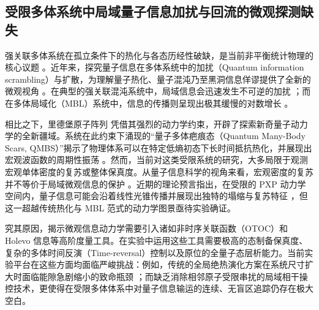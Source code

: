 \documentclass[../main.tex]{subfiles}
\begin{document}
\subsection{受限多体系统中局域量子信息加扰与回流的微观探测缺失}
\label{ch1:subsec:problem_info}
强关联多体系统在孤立条件下的热化与各态历经性破缺，是当前非平衡统计物理的核心议题 \cite{deutsch1991quantum,srednicki1994chaos,rigol2008thermalization,lewis2019dynamics}。近年来，探究量子信息在多体系统中的加扰（Quantum information scrambling）与扩散，为理解量子热化、量子混沌乃至黑洞信息佯谬提供了全新的微观视角 \cite{swingle2018unscrambling,sekino2008fast,hosur2016chaos,maldacena2016bound,hayden2007black,shenker2014black}。在典型的强关联混沌系统中，局域信息会迅速发生不可逆的加扰 \cite{lewis2019dynamics}；而在多体局域化（MBL）系统中，信息的传播则呈现出极其缓慢的对数增长 \cite{nandkishore2015many,abanin2019colloquium,lukin2019probing,schreiber2015observation,choi2016exploring,rispoli2019quantum,huang2017out,chen2017out,fan2017out,deng2017logarithmic,he2017characterizing,swingle2017slow,banuls2017dynamics}。

相比之下，里德堡原子阵列 \cite{kumar2018sorting,sheng2022defect,graham2022multi,barnes2022assembly,kim2022rydberg,okuno2022high,chen2023continuous,liu2023realization,singh2023mid,eckner2023realizing,ma2023high,zhao2023floquet,bluvstein2024logical,gregory2024second,pause2024supercharged,shaw2024benchmarking} 凭借其强烈的动力学约束，开辟了探索新奇量子动力学的全新疆域。系统在此约束下涌现的“量子多体疤痕态（Quantum Many-Body Scars, QMBS）”揭示了物理体系可以在特定低熵初态下长时间抵抗热化，并展现出宏观波函数的周期性振荡 \cite{bernien2017probing,turner2018weak,serbyn2021quantum,bluvstein2021controlling,desaules2024ergodicity}。然而，当前对这类受限系统的研究，大多局限于观测宏观单体密度的复苏或整体保真度。从量子信息科学的视角来看，宏观密度的复苏并不等价于局域微观信息的保护 \cite{choi2019emergent}。近期的理论预言指出，在受限的 PXP 动力学空间内，量子信息可能会沿着线性光锥传播并展现出独特的塌缩与复苏特征 \cite{yuan2022quantum}，但这一超越传统热化与 MBL 范式的动力学图景亟待实验确证。

究其原因，揭示微观信息动力学需要引入诸如非时序关联函数（OTOC）和 Holevo 信息等高阶度量工具。在实验中运用这些工具需要极高的态制备保真度、复杂的多体时间反演（Time-reversal）控制以及原位的全量子态层析能力。当前实验平台在这些方面均面临严峻挑战：例如，传统的全局绝热演化方案在系统尺寸扩大时面临能隙急剧缩小的致命瓶颈 \cite{bernien2017probing,omran2019generation}；而缺乏消除相邻原子受限串扰的局域相干操控技术，更使得在受限多体体系中对量子信息输运的连续、无盲区追踪仍存在极大空白。
\end{document}
